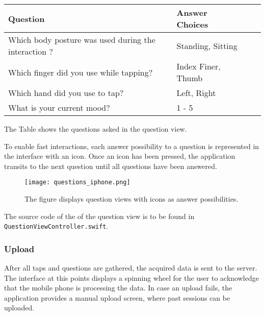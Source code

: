 \begin{center}
  \begin{tabular}{| l | l | l | l |}
  \hline
  \textbf{Question} & \textbf{Answer Choices} \\ \hline
  Which body posture was used during the interaction ? & Standing, Sitting \\
  Which finger did you use while tapping? & Index Finer, Thumb \\
  Which hand did you use to tap? & Left, Right \\
  What is your current mood? & 1 - 5 \\
  \hline
  \end{tabular}
  \caption{The Table shows the questions asked in the question view.}
\end{center}

To enable fast interactions, each answer possibility to a question is represented in the interface with an icon. Once an icon has been pressed, the application transits to the next question until all questions have been answered.\\

\begin{figure}[h!]
  \centering
  \texttt{[image: questions\_iphone.png]}
  \caption{The figure displays question views with icons as answer possibilities.}
\end{figure}

The source code of the of the question view is to be found in \texttt{QuestionViewController.swift}.

\subsubsection{Upload}
After all taps and questions are gathered, the acquired data is sent to the server. The interface at this points displays a spinning wheel for the user to acknowledge that the mobile phone is processing the data. In case an upload fails, the application provides a manual upload screen, where past sessions can be uploaded.


